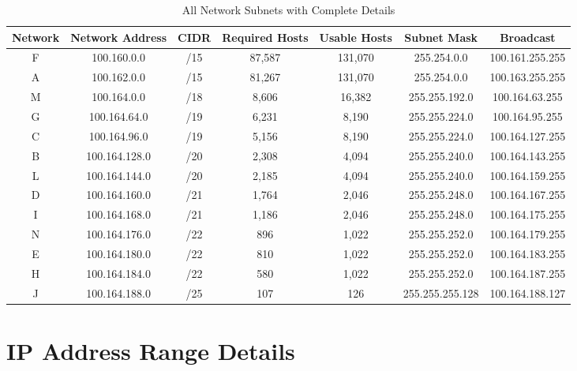 \documentclass[12pt,a4paper]{article}
\begin{document}
\begin{table}[h]
\centering
\footnotesize
\begin{tabular}{|c|c|c|c|c|c|c|}
\hline
\textbf{Network} & \textbf{Network Address} & \textbf{CIDR} & \textbf{Required Hosts} & \textbf{Usable Hosts} & \textbf{Subnet Mask} & \textbf{Broadcast} \\
\hline
F & 100.160.0.0 & /15 & 87,587 & 131,070 & 255.254.0.0 & 100.161.255.255 \\
A & 100.162.0.0 & /15 & 81,267 & 131,070 & 255.254.0.0 & 100.163.255.255 \\
M & 100.164.0.0 & /18 & 8,606 & 16,382 & 255.255.192.0 & 100.164.63.255 \\
G & 100.164.64.0 & /19 & 6,231 & 8,190 & 255.255.224.0 & 100.164.95.255 \\
C & 100.164.96.0 & /19 & 5,156 & 8,190 & 255.255.224.0 & 100.164.127.255 \\
B & 100.164.128.0 & /20 & 2,308 & 4,094 & 255.255.240.0 & 100.164.143.255 \\
L & 100.164.144.0 & /20 & 2,185 & 4,094 & 255.255.240.0 & 100.164.159.255 \\
D & 100.164.160.0 & /21 & 1,764 & 2,046 & 255.255.248.0 & 100.164.167.255 \\
I & 100.164.168.0 & /21 & 1,186 & 2,046 & 255.255.248.0 & 100.164.175.255 \\
N & 100.164.176.0 & /22 & 896 & 1,022 & 255.255.252.0 & 100.164.179.255 \\
E & 100.164.180.0 & /22 & 810 & 1,022 & 255.255.252.0 & 100.164.183.255 \\
H & 100.164.184.0 & /22 & 580 & 1,022 & 255.255.252.0 & 100.164.187.255 \\
J & 100.164.188.0 & /25 & 107 & 126 & 255.255.255.128 & 100.164.188.127 \\
\hline
\end{tabular}
\caption{All Network Subnets with Complete Details}
\end{table}

\vspace{0.5cm}

\section*{IP Address Range Details}
\end{document}
